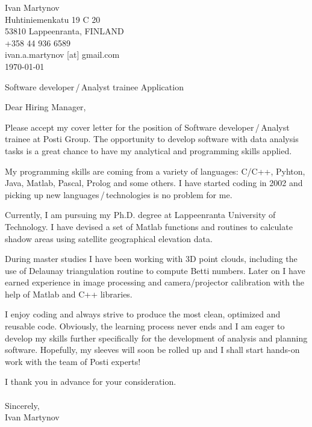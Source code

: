 \documentclass[]{article}
\begin{document}
\begin{flushright}
	Ivan Martynov\\
  Huhtiniemenkatu 19 C 20\\
	53810 Lappeenranta, FINLAND\\
	+358 44 936 6589\\
	ivan.a.martynov [at] gmail.com\\
	\today
\end{flushright}


\begin{center}
  Software developer\,/\,Analyst trainee Application
\end{center}

\noindent
Dear Hiring Manager,
\bigskip

\noindent
Please accept my cover letter for the position of Software developer\,/\,Analyst
trainee at Posti Group. The opportunity to develop software with data analysis
tasks is a great chance to have my analytical and programming skills applied.
\medskip

\noindent
My programming skills are coming from a variety of languages: C/C++, Pyhton,
Java, Matlab, Pascal, Prolog and some others. I have started coding in 2002 and
picking up new languages\,/\,technologies is no problem for me.
\medskip

\noindent
Currently, I am pursuing my Ph.D. degree at Lappeenranta University of
Technology. I have devised a set of Matlab functions and routines to
calculate shadow areas using satellite geographical elevation data.
\medskip

\noindent
During master studies I have been working with 3D point clouds, including the
use of Delaunay triangulation routine to compute Betti numbers.  Later on I have
earned experience in image processing and camera/projector calibration with the
help of Matlab and C++ libraries.
\medskip

\noindent
I enjoy coding and always strive to produce the most clean, optimized and
reusable code. Obviously, the learning process never ends and I am eager to
develop my skills further specifically for the development of analysis and
planning software. Hopefully, my sleeves will soon be rolled up and I shall
start hands-on work with the team of Posti experts!
\medskip

\noindent
I thank you in advance for your consideration.\\\ \\

\noindent Sincerely,\\
Ivan Martynov
\end{document}
